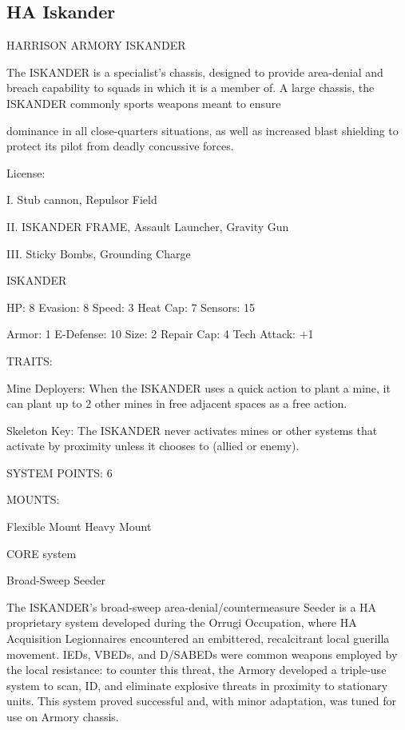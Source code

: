 \subsection{HA Iskander}

                              HARRISON ARMORY ISKANDER

The ISKANDER is a specialist's chassis, designed to provide area-denial and breach capability to squads in
which it is a member of. A large chassis, the ISKANDER commonly sports weapons meant to ensure

dominance in all close-quarters situations, as well as increased blast shielding to protect its pilot from
deadly concussive forces.

                                                   License:

I. Stub cannon, Repulsor Field

II. ISKANDER FRAME, Assault Launcher, Gravity Gun

III. Sticky Bombs, Grounding Charge


                                                ISKANDER

 HP: 8          Evasion: 8                            Speed: 3           Heat Cap: 7        Sensors: 15

 Armor: 1       E-Defense: 10                         Size: 2            Repair Cap: 4      Tech Attack:
                                                                                            +1

                                                  TRAITS:

 Mine Deployers: When the ISKANDER uses a quick action to plant a mine, it can plant up to 2 other
 mines in free adjacent spaces as a free action.

 Skeleton Key: The ISKANDER never activates mines or other systems that activate by proximity unless
 it chooses to (allied or enemy).

                                            SYSTEM POINTS: 6

                                                  MOUNTS:

 Flexible Mount                    Heavy Mount

                                               CORE system




                                             Broad-Sweep Seeder

 The ISKANDER’s broad-sweep area-denial/countermeasure Seeder is a HA proprietary system
 developed during the Orrugi Occupation, where HA Acquisition Legionnaires encountered an
 embittered, recalcitrant local guerilla movement. IEDs, VBEDs, and D/SABEDs were common weapons
 employed by the local resistance: to counter this threat, the Armory developed a triple-use system to
 scan, ID, and eliminate explosive threats in proximity to stationary units. This system proved successful
 and, with minor adaptation, was tuned for use on Armory chassis.

